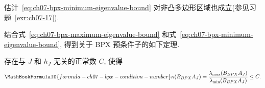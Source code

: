 \begin{Remark}
\label{rem:ch07-bpx-nonconvex-extension}
估计~\eqref{eq:ch07-bpx-minimum-eigenvalue-bound} 对非凸多边形区域也成立(参见习题~\ref{exr:ch07-17}).
\end{Remark}

结合式~\eqref{eq:ch07-bpx-maximum-eigenvalue-bound} 和式~\eqref{eq:ch07-bpx-minimum-eigenvalue-bound}, 得到关于 BPX 预条件子的如下定理.

\begin{Theorem}
\label{thm:ch07-bpx-condition-number}
存在与 $J$ 和 $h_J$ 无关的正常数 $C$, 使得
\[
\MathBookFormulaID{formula-ch07-bpx-condition-number}
\kappa(B_{BPX}A_J)
=\frac{\lambda_{\max}(B_{BPX}A_J)}{\lambda_{\min}(B_{BPX}A_J)}
\leq C.
\]
\end{Theorem}

